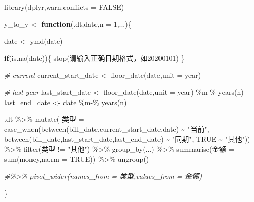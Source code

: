 \documentclass[
]{book}
\newenvironment{Shaded}{\begin{snugshade}}{\end{snugshade}}
\newcommand{\AttributeTok}[1]{\textcolor[rgb]{0.77,0.63,0.00}{#1}}
\newcommand{\CommentTok}[1]{\textcolor[rgb]{0.56,0.35,0.01}{\textit{#1}}}
\newcommand{\ConstantTok}[1]{\textcolor[rgb]{0.00,0.00,0.00}{#1}}
\newcommand{\ControlFlowTok}[1]{\textcolor[rgb]{0.13,0.29,0.53}{\textbf{#1}}}
\newcommand{\DecValTok}[1]{\textcolor[rgb]{0.00,0.00,0.81}{#1}}
\newcommand{\FunctionTok}[1]{\textcolor[rgb]{0.00,0.00,0.00}{#1}}
\newcommand{\NormalTok}[1]{#1}
\newcommand{\OtherTok}[1]{\textcolor[rgb]{0.56,0.35,0.01}{#1}}
\newcommand{\SpecialCharTok}[1]{\textcolor[rgb]{0.00,0.00,0.00}{#1}}
\newcommand{\StringTok}[1]{\textcolor[rgb]{0.31,0.60,0.02}{#1}}
\begin{document}
\begin{Shaded}
\begin{Highlighting}[]
\FunctionTok{library}\NormalTok{(dplyr,}\AttributeTok{warn.conflicts =} \ConstantTok{FALSE}\NormalTok{)}

\NormalTok{y\_to\_y }\OtherTok{\textless{}{-}} \ControlFlowTok{function}\NormalTok{(.dt,date,}\AttributeTok{n =} \DecValTok{1}\NormalTok{,...)\{}
  
\NormalTok{  date }\OtherTok{\textless{}{-}} \FunctionTok{ymd}\NormalTok{(date)}
  
  \ControlFlowTok{if}\NormalTok{(}\FunctionTok{is.na}\NormalTok{(date))\{}
    \FunctionTok{stop}\NormalTok{(}\StringTok{\textquotesingle{}请输入正确日期格式，如20200101\textquotesingle{}}\NormalTok{)}
\NormalTok{  \} }
  
  \CommentTok{\# current }
\NormalTok{ current\_start\_date }\OtherTok{\textless{}{-}}  \FunctionTok{floor\_date}\NormalTok{(date,}\AttributeTok{unit =} \StringTok{\textquotesingle{}year\textquotesingle{}}\NormalTok{)}
 
 \CommentTok{\# last year}
\NormalTok{ last\_start\_date }\OtherTok{\textless{}{-}} \FunctionTok{floor\_date}\NormalTok{(date,}\AttributeTok{unit =} \StringTok{\textquotesingle{}year\textquotesingle{}}\NormalTok{) }\SpecialCharTok{\%m{-}\%} \FunctionTok{years}\NormalTok{(n)}
\NormalTok{ last\_end\_date }\OtherTok{\textless{}{-}}\NormalTok{ date }\SpecialCharTok{\%m{-}\%} \FunctionTok{years}\NormalTok{(n)}
 
\NormalTok{ .dt }\SpecialCharTok{\%\textgreater{}\%} \FunctionTok{mutate}\NormalTok{( 类型 }\OtherTok{=} \FunctionTok{case\_when}\NormalTok{(}\FunctionTok{between}\NormalTok{(bill\_date,current\_start\_date,date) }\SpecialCharTok{\textasciitilde{}} \StringTok{"当前"}\NormalTok{,}
               \FunctionTok{between}\NormalTok{(bill\_date,last\_start\_date,last\_end\_date) }\SpecialCharTok{\textasciitilde{}} \StringTok{"同期"}\NormalTok{,}
               \ConstantTok{TRUE} \SpecialCharTok{\textasciitilde{}} \StringTok{"其他"}\NormalTok{)) }\SpecialCharTok{\%\textgreater{}\%} 
   \FunctionTok{filter}\NormalTok{(类型 }\SpecialCharTok{!=} \StringTok{"其他"}\NormalTok{) }\SpecialCharTok{\%\textgreater{}\%} 
   \FunctionTok{group\_by}\NormalTok{(...) }\SpecialCharTok{\%\textgreater{}\%} 
   \FunctionTok{summarise}\NormalTok{(金额 }\OtherTok{=} \FunctionTok{sum}\NormalTok{(money,}\AttributeTok{na.rm =} \ConstantTok{TRUE}\NormalTok{)) }\SpecialCharTok{\%\textgreater{}\%} 
   \FunctionTok{ungroup}\NormalTok{() }
 
 \CommentTok{\#\%\textgreater{}\% pivot\_wider(names\_from = \textquotesingle{}类型\textquotesingle{},values\_from = \textquotesingle{}金额\textquotesingle{})}
 
\NormalTok{\}}
\end{Highlighting}
\end{Shaded}
\end{document}
